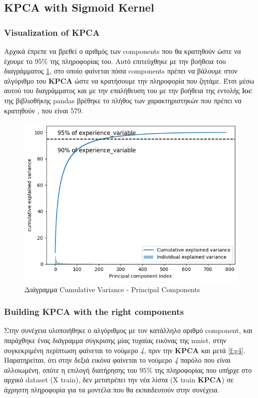 \subsection{KPCA with Sigmoid Kernel}

\subsubsection{Visualization of KPCA}
Αρχικά έπρεπε να βρεθεί ο αριθμός των components που θα κρατηθούν ώστε να έχουμε το $95\%$ της πληροφορίας του. Αυτό επιτεύχθηκε με την βοήθεια του διαγράμματος \ref{f:g3}, στο οποίο φαίνεται πόσα components πρέπει να βάλουμε στον αλγόριθμο του \textbf{KPCA} ώστε να κρατήσουμε την πληροφορία που ζητάμε. Έτσι μέσω αυτού του διαγράμματος και με την επαλήθευση του με την βοήθεια της εντολής \textbf{loc} της βιβλιοθήκης pandas βρέθηκε το πλήθος των χαρακτηριστηκών που πρέπει να κρατηθούν , που είναι 579.


\begin{figure}[ht]
	\centering
	\includegraphics[width=1\linewidth]{Images data1/KPCAsigmplot.png}
	\caption{ Διάγραμμα Cumulative Variance - Principal Components  }
	\label{f:g3}	
\end{figure}

\subsubsection{Building KPCA with the right components}

Στην συνέχεια υλοποιήθηκε ο αλγόριθμος με τον κατάλληλο αριθμό component, και παράχθηκε ένας διάγραμμα σύγκρισης μίας τυχαίας εικόνας της mnist, στην συγκεκριμένη περίπτωση φαίνεται το νούμερο \emph{4}, πριν την \textbf{KPCA} και μετά \ref{f:g4}. Παρατηρείται, ότι στην δεξιά εικόνα φαίνεται το νούμερο \emph{4} παρόλο που είναι αλλοιωμένη, οπότε η επιλογή διατήρησης του $95\%$ της πληροφορίας που υπήρχε στο αρχικό dataset (Χ train), δεν μετατρέπει την νέα λίστα (X train \textbf{KPCA}) σε άχρηστη πληροφορία για τα μοντέλα που θα εκπαιδευτούν στην συνέχεια.


